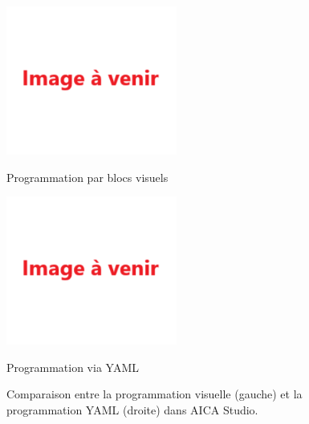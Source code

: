 \begin{figure}[H]
    \centering
    \begin{minipage}{0.48\textwidth}
        \centering
        \includegraphics[width=0.95\linewidth]{assets/figures/img_a_venir.png}
        \caption*{Programmation par blocs visuels}
    \end{minipage}\hfill
    \begin{minipage}{0.48\textwidth}
        \centering
        \includegraphics[width=0.95\linewidth]{assets/figures/img_a_venir.png}
        \caption*{Programmation via YAML}
    \end{minipage}
    \caption{Comparaison entre la programmation visuelle (gauche) et la programmation YAML (droite) dans AICA Studio.}
    \label{fig:comparaison_yaml_visuel}
\end{figure}

